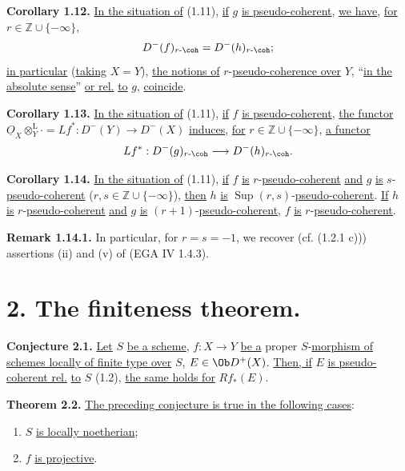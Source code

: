 \textbf{Corollary 1.12.} \uline{In the situation of} (1.11), \uline{if} \(g\) \uline{is pseudo-coherent}, \uline{we have}, \uline{for} \(r\in\mathbb Z\cup\{-\infty\}\),
\[
  D^{-}(f)_{r\text{-}\coh}=D^{-}(h)_{r\text{-}\coh};
\]
\uline{in particular} (\uline{taking} \(X=Y\)), \uline{the notions of} \(r\)-\uline{pseudo-coherence over} \(Y\), ``\uline{in the absolute sense}'' \uline{or rel.} \uline{to} \(g\), \uline{coincide}.

\textbf{Corollary 1.13.} \uline{In the situation of} (1.11), \uline{if} \(f\) \uline{is pseudo-coherent}, \uline{the functor} \(\underline{O}_X\otimes_Y^{\mathrm L}\cdot=Lf^*:D^{-}(Y)\longrightarrow D^{-}(X)\) \uline{induces}, \uline{for} \(r\in\mathbb Z\cup\{-\infty\}\), \uline{a functor}
\[
  Lf^*:D^{-}(g)_{r\text{-}\coh}\longrightarrow D^{-}(h)_{r\text{-}\coh}.
\]

\textbf{Corollary 1.14.} \uline{In the situation of} (1.11), \uline{if} \(f\) \uline{is} \(r\)-\uline{pseudo-coherent} \uline{and} \(g\) \uline{is} \(s\)-\uline{pseudo-coherent} (\(r,s\in\mathbb Z\cup\{-\infty\}\)), \uline{then} \(h\) \uline{is} \(\operatorname{Sup}(r,s)\)-\uline{pseudo-coherent}. \uline{If} \(h\) \uline{is} \(r\)-\uline{pseudo-coherent} \uline{and} \(g\) \uline{is} \((r+1)\)-\uline{pseudo-coherent}, \(f\) \uline{is} \(r\)-\uline{pseudo-coherent}.

\textbf{Remark 1.14.1.} In particular, for \(r=s=-1\), we recover (cf. (1.2.1 c))) assertions (ii) and (v) of (EGA IV 1.4.3).

\section*{2. The finiteness theorem.}

\textbf{Conjecture 2.1.} \uline{Let} \(S\) \uline{be a scheme}, \(f:X\to Y\) \uline{be a} proper \(S\)-\uline{morphism of schemes locally of finite type over} \(S\), \(E\in\Ob D^+(X)\). \uline{Then, if} \(E\) \uline{is pseudo-coherent rel.} \uline{to} \(S\) (1.2), \uline{the same holds for} \(Rf_*(E)\).

\textbf{Theorem 2.2.} \uline{The preceding conjecture is true in the following cases}:
\begin{enumerate}[label=(\roman*)]
\item \(S\) \uline{is locally noetherian};
\item \(f\) \uline{is projective}.
\end{enumerate}

